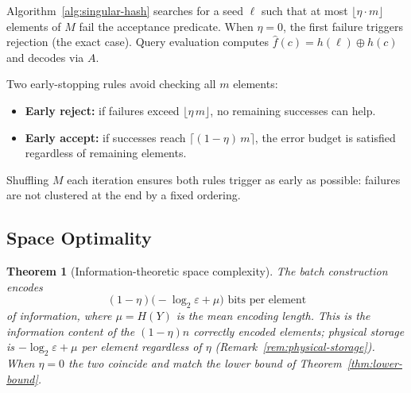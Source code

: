 \documentclass[11pt]{article}
\theoremstyle{definition}
\theoremstyle{plain}
\newtheorem{theorem}{Theorem}[section]
\theoremstyle{remark}
\newcommand{\fhat}{\hat{f}}
\begin{document}
Algorithm~\ref{alg:singular-hash} searches for a seed $\ell$ such that at most
$\lfloor \eta \cdot m \rfloor$ elements of $M$ fail the acceptance
predicate.  When $\eta = 0$, the first failure triggers rejection (the
exact case).  Query evaluation computes
$\fhat(c) = h(\ell) \oplus h(c)$ and decodes via $A$.

Two early-stopping rules avoid checking all $m$ elements:
\begin{itemize}
\item \textbf{Early reject:} if failures exceed $\lfloor \eta\, m \rfloor$,
    no remaining successes can help.
\item \textbf{Early accept:} if successes reach $\lceil (1-\eta)\, m \rceil$,
    the error budget is satisfied regardless of remaining elements.
\end{itemize}
Shuffling $M$ each iteration ensures both rules trigger as early as
possible: failures are not clustered at the end by a fixed ordering.

\subsection{Space Optimality}

\begin{theorem}[Information-theoretic space complexity]
\label{thm:space-optimal}
The batch construction encodes
\begin{equation}
(1-\eta)\bigl(-\log_2 \varepsilon + \mu\bigr) \text{ bits per element}
\end{equation}
of information, where $\mu = H(Y)$ is the mean encoding length.  This is
the information content of the $(1-\eta)n$ correctly encoded elements;
physical storage is $-\log_2 \varepsilon + \mu$ per element regardless of
$\eta$ (Remark~\ref{rem:physical-storage}).  When $\eta = 0$ the two
coincide and match the lower bound of Theorem~\ref{thm:lower-bound}.
\end{theorem}
\end{document}
